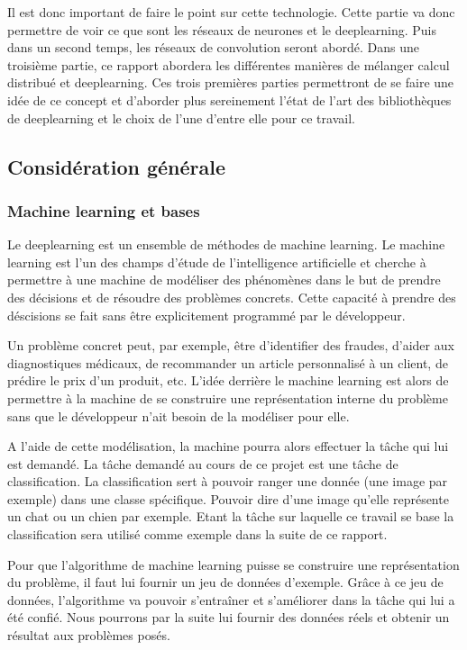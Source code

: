 \documentclass[a4paper,10pt,openany,oneside]{sphinxmanual}
\begin{document}
Il est donc important de faire le point sur cette technologie. Cette partie va donc permettre de voir ce que sont les réseaux de neurones
et le deeplearning. Puis dans un second temps, les réseaux de convolution seront abordé. Dans une troisième partie, ce rapport abordera
les différentes manières de mélanger calcul distribué et deeplearning. Ces trois premières parties permettront de se faire une idée de ce
concept et d'aborder plus sereinement l'état de l'art des bibliothèques de deeplearning et le choix de l'une d'entre elle pour ce travail.


\subsection{Considération générale}
\label{index:consideration-generale}

\subsubsection{Machine learning et bases}
\label{index:machine-learning-et-bases}
Le deeplearning est un ensemble de méthodes de machine learning. Le machine learning est l'un des champs d'étude de l'intelligence artificielle
et cherche à permettre à une machine de modéliser des phénomènes dans le but de prendre des décisions et de résoudre des problèmes concrets.
Cette capacité à prendre des déscisions se fait sans être explicitement programmé par le développeur.

Un problème concret peut, par exemple, être d'identifier des fraudes, d'aider aux diagnostiques médicaux, de recommander un article
personnalisé à un client, de prédire le prix d'un produit, etc. L'idée derrière le machine learning est alors de permettre à la machine de
se construire une représentation interne du problème sans que le développeur n'ait besoin de la modéliser pour elle.

A l'aide de cette modélisation, la machine pourra alors effectuer la tâche qui lui est demandé. La tâche demandé au cours de ce projet est
une tâche de classification. La classification sert à pouvoir ranger une donnée (une image par exemple) dans une classe spécifique.
Pouvoir dire d'une image qu'elle représente un chat ou un chien par exemple. Etant la tâche sur laquelle ce travail se base la
classification sera utilisé comme exemple dans la suite de ce rapport.

Pour que l'algorithme de machine learning puisse se construire une représentation du problème, il faut lui fournir un jeu de données
d'exemple. Grâce à ce jeu de données, l'algorithme va pouvoir s'entraîner et s'améliorer dans la tâche qui lui a été confié. Nous pourrons
par la suite lui fournir des données réels et obtenir un résultat aux problèmes posés.
\end{document}
